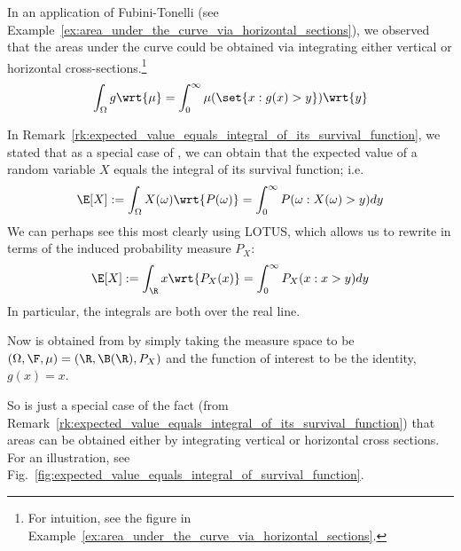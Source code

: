 \documentclass{article} %
\newcommand{\dmu}{\wrt{\mu}}
\begin{document}
\begin{remark}\;
In an application of Fubini-Tonelli (see Example~\ref{ex:area_under_the_curve_via_horizontal_sections}), we observed that the areas under the curve could be obtained via integrating either vertical or horizontal cross-sections.\footnote{For intuition, see the figure in Example~\ref{ex:area_under_the_curve_via_horizontal_sections}.} 
\begin{align}
 \int_\Omega g \dmu = \int_0^\infty \mu(\set{x : g(x) > y}) \wrt{y} 
\label{eqn:area_under_curve_via_integrating_either_vertical_or_horizontal_cross_sections_restated}	
\end{align}

 In Remark~\ref{rk:expected_value_equals_integral_of_its_survival_function}, we stated that as a special case of , we can obtain that the expected value of a random variable $X$ equals the integral of its survival function; i.e. 
\begin{align}
\E[X] := \int_\Omega X(\omega) \wrt{P(\omega)} =  \int_0^\infty P(\omega: X(\omega) > y) dy
\label{eqn:expectation_as_integral_of_survival_function_restated}	
\end{align}
We can perhaps see this most clearly using LOTUS, which allows us to rewrite 	 in terms of the induced probability measure $P_X$: 
\begin{align}
\E[X] := \int_\R x \wrt{P_X(x)} =  \int_0^\infty P_X(x: x > y) dy
\label{eqn:expectation_as_integral_of_survival_function_after_applying_LOTUS}	
\end{align}
%
In particular, the integrals are both over the real line.

Now  is obtained from  by simply taking the measure space to be $(\Omega, \F, \mu) = (\R,\B(\R), P_X)$ and the function of interest to be the identity, $g(x)=x$.   

So 	 is just a special case of the fact (from Remark~\ref{rk:expected_value_equals_integral_of_its_survival_function}) that areas can be obtained either by integrating vertical or horizontal cross sections. For an illustration, see Fig.~\ref{fig:expected_value_equals_integral_of_survival_function}.


\end{remark}
\end{document}
